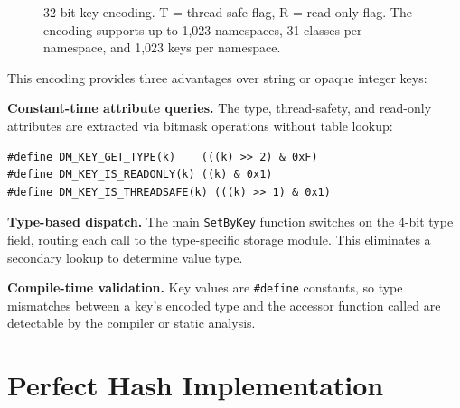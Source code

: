 \documentclass[10pt,twocolumn,letterpaper]{article}
\begin{document}
\begin{figure}[t]
\centering
{}
\caption{32-bit key encoding.  T = thread-safe flag, R = read-only
flag.  The encoding supports up to 1,023 namespaces, 31 classes per
namespace, and 1,023 keys per namespace.}
\label{fig:key-layout}
\end{figure}

This encoding provides three advantages over string or opaque integer
keys:

\textbf{Constant-time attribute queries.}  The type, thread-safety,
and read-only attributes are extracted via bitmask operations without
table lookup:

\begin{lstlisting}
#define DM_KEY_GET_TYPE(k)    (((k) >> 2) & 0xF)
#define DM_KEY_IS_READONLY(k) ((k) & 0x1)
#define DM_KEY_IS_THREADSAFE(k) (((k) >> 1) & 0x1)
\end{lstlisting}

\textbf{Type-based dispatch.}  The main \texttt{SetByKey} function
switches on the 4-bit type field, routing each call to the
type-specific storage module.  This eliminates a secondary lookup to
determine value type.

\textbf{Compile-time validation.}  Key values are \texttt{\#define}
constants, so type mismatches between a key's encoded type and the
accessor function called are detectable by the compiler or static
analysis.

\section{Perfect Hash Implementation}
\label{sec:perfect-hash}
\end{document}
